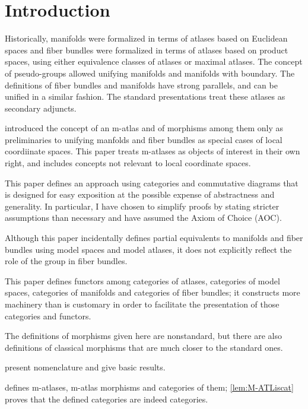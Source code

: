 \documentclass{article}
\begin{document}

\part {Introduction}
\label{part:intro}

Historically, manifolds were formalized in terms of atlases based on
Euclidean spaces and fiber bundles were formalized in terms of atlases
based on product spaces, using either equivalence classes of atlases or
maximal atlases.  The concept of pseudo-groups allowed unifying
manifolds and manifolds with boundary.  The definitions of fiber bundles
and manifolds have strong parallels, and can be unified in a similar
fashion.  The standard presentations treat these atlases as secondary
adjuncts.

\cite{LCS} introduced the concept of an m-atlas and of morphisms among
them only as preliminaries to unifying manfolds and fiber bundles as
special cases of local coordiinate spaces.  This paper treats m-atlases
as objects of interest in their own right, and includes concepts not
relevant to local coordinate spaces.

This paper defines an approach using categories and
commutative diagrams that is designed for easy exposition at the possible
expense of abstractness and generality. In particular, I have chosen to
simplify proofs by stating stricter assumptions than necessary and have
assumed the Axiom of Choice (AOC).

Although this paper incidentally defines partial equivalents to
manifolds and fiber bundles using model spaces and model atlases, it
does not explicitly reflect the role of the group in fiber bundles.

This paper defines functors among categories of atlases, categories of
model spaces, categories of manifolds and categories of fiber bundles;
it constructs more machinery than is customary in order to facilitate
the presentation of those categories and functors.

\begin{remark}
The definitions of morphisms given here are nonstandard, but there are
also definitions of classical morphisms that are much closer to the
standard ones.
\end{remark}

 present nomenclature and give basic
results.

 defines m-atlases, m-atlas morphisms and categories
of them;
{
  \showlabelsinline
  \cref{lem:M-ATLiscat}
}
proves that the defined categories are indeed categories.
\end{document}
